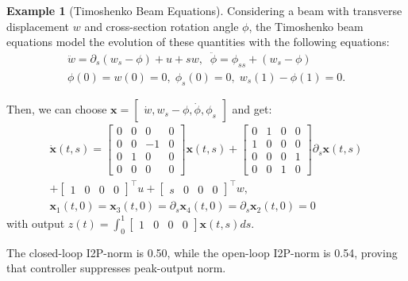 \documentclass[letterpaper, 10 pt, conference]{ieeeconf}
\newcommand{\mbf}[1]{\mathbf{#1}}
\theoremstyle{definition}
\newtheorem{example}{Example}
\begin{document}
\begin{example}[Timoshenko Beam Equations]
Considering a beam with transverse displacement $w$ and cross-section rotation angle $\phi$, the Timoshenko beam equations model the evolution of these quantities with the following equations:
\begin{align}
\ddot{w} = \partial_s(w_s - \phi)+u+sw, \;\; \ddot{\phi} = \phi_{ss} +(w_s - \phi)  \nonumber 
\\ \phi(0) = w(0) = 0, \; \phi_s(0) = 0, \; w_s(1) - \phi(1) = 0. \nonumber
\end{align}

Then, we can choose $\mbf x = \begin{bmatrix}
    \dot{w},  w_s -\phi, \dot{\phi}, \phi_s
\end{bmatrix}$ and get:
\begin{align}
    \dot{\mbf x}(t,s) = \begin{bmatrix}
        0 & 0&0&0\\ 0&0&-1&0\\ 0 &1 &0&0\\ 0&0&0&0
    \end{bmatrix} \mathbf{x}(t,s) + \begin{bmatrix}
        0&1&0&0\\ 1&0&0&0\\ 0&0&0&1\\ 0&0&1&0
    \end{bmatrix} \partial_s \mbf{x}(t,s)\nonumber\\+\begin{bmatrix}
        1&0&0&0
    \end{bmatrix}^\top u + \begin{bmatrix}
        s&0&0&0
    \end{bmatrix}^\top w\nonumber,    
    \\\mathbf{x}_1(t,0) = \mathbf{x}_3(t,0) = \partial_s\mathbf{x}_4(t,0) = \partial_s\mathbf{x}_2(t,0) = 0 \nonumber
\end{align} with output  $z(t) = \int_0^1 \begin{bmatrix}
        1 & 0&0&0
    \end{bmatrix} \mathbf{x}(t,s) ds$. 

The closed-loop I2P-norm is 0.50, while the open-loop I2P-norm is 0.54, proving that controller suppresses peak-output norm.
\end{example}
\end{document}
